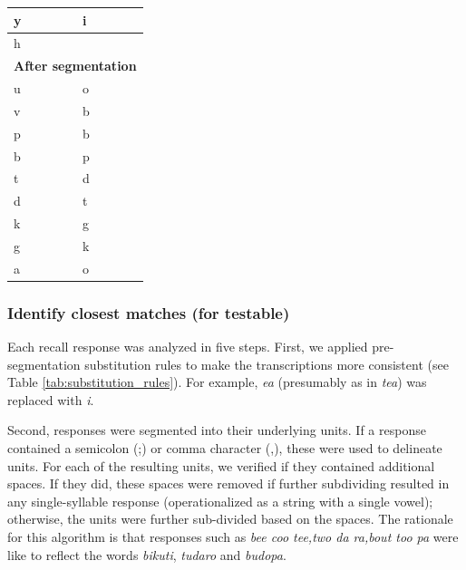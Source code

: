 \documentclass[]{article}
\begin{document}
\begin{table}
\begin{tabular}[t]{l|l}
\hline
\hspace{1em}y & i\\
\hline
\hspace{1em}h & \\
\hline
\multicolumn{2}{l}{\textbf{After segmentation}}\\
\hline
\hspace{1em}u & o\\
\hline
\hspace{1em}v & b\\
\hline
\hspace{1em}p & b\\
\hline
\hspace{1em}b & p\\
\hline
\hspace{1em}t & d\\
\hline
\hspace{1em}d & t\\
\hline
\hspace{1em}k & g\\
\hline
\hspace{1em}g & k\\
\hline
\hspace{1em}a & o\\
\hline
\end{tabular}
\end{table}

\subsubsection{Identify closest matches (for
testable)}\label{identify-closest-matches-for-testable}

Each recall response was analyzed in five steps. First, we applied
pre-segmentation substitution rules to make the transcriptions more
consistent (see Table \ref{tab:substitution_rules}). For example,
\emph{ea} (presumably as in \emph{tea}) was replaced with \emph{i}.

Second, responses were segmented into their underlying units. If a
response contained a semicolon (;) or comma character (,), these were
used to delineate units. For each of the resulting units, we verified if
they contained additional spaces. If they did, these spaces were removed
if further subdividing resulted in any single-syllable response
(operationalized as a string with a single vowel); otherwise, the units
were further sub-divided based on the spaces. The rationale for this
algorithm is that responses such as \emph{bee coo tee,two da ra,bout too
pa} were like to reflect the words \emph{bikuti}, \emph{tudaro} and
\emph{budopa}.
\end{document}
